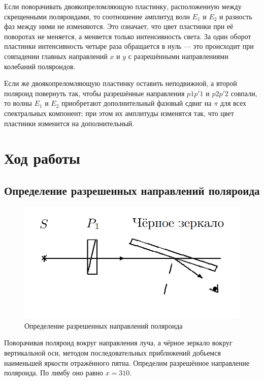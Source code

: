 \documentclass[12pt]{kiarticle}
\begin{document}
Если поворачивать двоякопреломляющую пластинку, расположенную между
скрещенными поляроидами, то соотношение амплитуд волн $ E_1 $ и $ E_2 $ и разность фаз между ними не изменяются. Это означает, что цвет пластинки при её поворотах не меняется, а меняется только интенсивность света. За один оборот пластинки интенсивность четыре раза обращается в нуль --- это происходит при совпадении главных направлений
$ x $ и $ y $ с разрешёнными направлениями колебаний поляроидов.

Если же двоякопреломляющую пластинку оставить неподвижной, а
второй поляроид повернуть так, чтобы разрешённые направления $ p1p'1 $
и $ p2p'2 $ совпали, то волны $ E_1 $ и $ E_2 $ приобретают дополнительный фазовый сдвиг на $ \pi $ для всех спектральных компонент; при этом их амплитуды изменятся так, что цвет пластинки изменится на дополнительный. 

\section{Ход работы}

\subsection{Определение разрешенных направлений поляроида}

\begin{figure}
	\includegraphics[width=\linewidth]{5}
	\caption{Определение разрешенных направлений поляроида}
	\label{ris 5}
\end{figure}

Поворачивая поляроид вокруг направления луча, а чёрное зеркало вокруг вертикальной оси, методом последовательных приближений добьемся
наименьшей яркости отражённого пятна. Определим разрешённое направление поляроида. По лимбу оно равно $ x = 310 $. 
\end{document}
